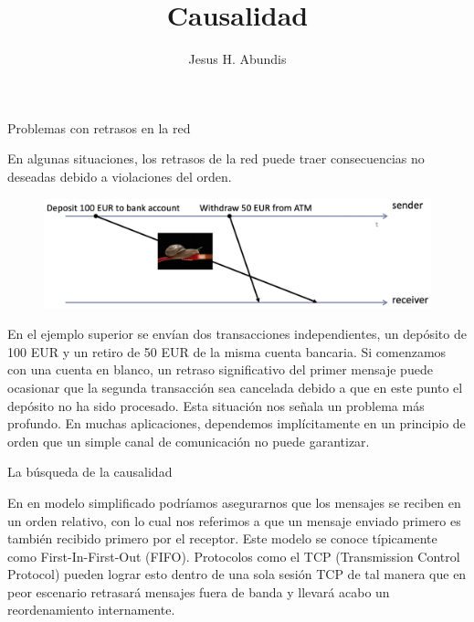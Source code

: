 \documentclass[12pt]{article}
\begin{document}
\title{Causalidad}
\author{Jesus H. Abundis}
\maketitle
\thispagestyle{empty}

{\large Problemas con retrasos en la red}

\vspace{10pt}
En algunas situaciones, los retrasos de la red puede traer consecuencias no deseadas debido a violaciones del orden.

\begin{figure}[h]
   \centering
   \includegraphics[scale=0.5]{deposito_causalidad.png}
\end{figure}

En el ejemplo superior se envían dos transacciones independientes, 
un depósito de 100 EUR y un retiro de 50 EUR de la misma cuenta bancaria.
Si comenzamos con una cuenta en blanco, 
un retraso significativo del primer mensaje puede ocasionar que la segunda transacción sea cancelada debido a que en este punto el depósito no ha sido procesado.
Esta situación nos señala un problema más profundo.
En muchas aplicaciones, dependemos implícitamente en un principio de orden que un simple canal de comunicación no puede garantizar.


\vspace{15pt}
{\large La búsqueda de la causalidad}

\vspace{10pt}
En en modelo simplificado podríamos asegurarnos que los mensajes se reciben en un orden relativo,
con lo cual nos referimos a que un mensaje enviado primero es también recibido primero por el receptor.
Este modelo se conoce típicamente como First-In-First-Out (FIFO).
Protocolos como el TCP (Transmission Control Protocol) pueden lograr esto dentro de una sola sesión TCP de tal manera que en peor escenario retrasará mensajes fuera de banda y llevará acabo un reordenamiento internamente.
\end{document}
